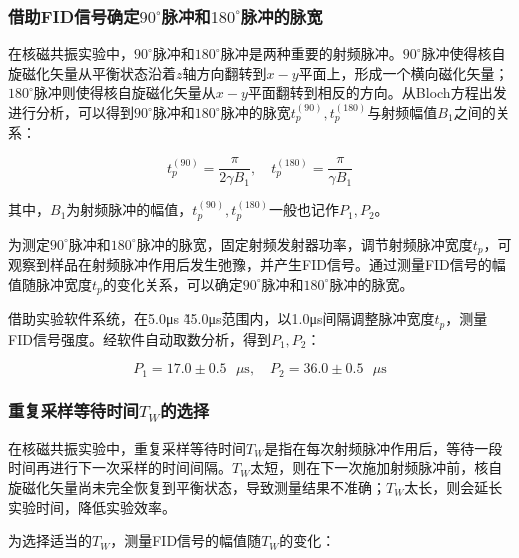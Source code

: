 \documentclass{thuemp}
\begin{document}
\subsubsection{借助FID信号确定$90^\circ$脉冲和$180^\circ$脉冲的脉宽}    

在核磁共振实验中，$90^\circ$脉冲和$180^\circ$脉冲是两种重要的射频脉冲。$90^\circ$脉冲使得核自旋磁化矢量从平衡状态沿着$z$轴方向翻转到$x-y$平面上，形成一个横向磁化矢量；$180^\circ$脉冲则使得核自旋磁化矢量从$x-y$平面翻转到相反的方向。从Bloch方程出发进行分析，可以得到$90^\circ$脉冲和$180^\circ$脉冲的脉宽$t_p^{(90)}, t_p^{(180)}$与射频幅值$B_1$之间的关系：

\begin{equation}
t_p^{(90)} = \frac{\pi}{2\gamma B_1}, \quad t_p^{(180)} = \frac{\pi}{\gamma B_1}
\label{eq:pulse_width}
\end{equation}

其中，$B_1$为射频脉冲的幅值，$t_p^{(90)}, t_p^{(180)}$一般也记作$P_1, P_2$。

为测定$90^\circ$脉冲和$180^\circ$脉冲的脉宽，固定射频发射器功率，调节射频脉冲宽度$t_p$，可观察到样品在射频脉冲作用后发生弛豫，并产生FID信号。通过测量FID信号的幅值随脉冲宽度$t_p$的变化关系，可以确定$90^\circ$脉冲和$180^\circ$脉冲的脉宽。

借助实验软件系统，在5.0\si{\micro \second} \~ 45.0\si{\micro \second}范围内，以1.0\si{\micro \second}间隔调整脉冲宽度$t_p$，测量FID信号强度。经软件自动取数分析，得到$P_1, P_2$：

\begin{equation}
    P_1 = 17.0 \pm 0.5 \text{ }\mu\text{s}, \quad P_2 = 36.0 \pm 0.5 \text{ }\mu\text{s}
\end{equation}

\subsubsection{重复采样等待时间$T_W$的选择}

在核磁共振实验中，重复采样等待时间$T_W$是指在每次射频脉冲作用后，等待一段时间再进行下一次采样的时间间隔。$T_W$太短，则在下一次施加射频脉冲前，核自旋磁化矢量尚未完全恢复到平衡状态，导致测量结果不准确；$T_W$太长，则会延长实验时间，降低实验效率。

为选择适当的$T_W$，测量FID信号的幅值随$T_W$的变化：
\end{document}
